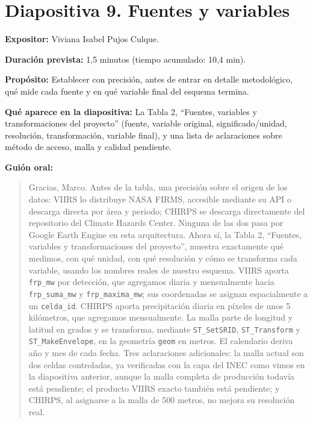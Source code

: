\documentclass[11pt,a4paper]{article}
\newcommand{\campo}[2]{\par\medskip\noindent\textbf{#1:} #2\par}
\newenvironment{guionoral}{%
  \medskip\noindent\textbf{Gui\'on oral:}\par\smallskip
  \begin{quote}\small
}{%
  \end{quote}
}
\begin{document}
\section*{Diapositiva 9. Fuentes y variables}

\campo{Expositor}{Viviana Isabel Pujos Culque.}
\campo{Duraci\'on prevista}{1,5 minutos (tiempo acumulado: 10,4 min).}
\campo{Prop\'osito}{Establecer con precisi\'on, antes de entrar en
detalle metodol\'ogico, qu\'e mide cada fuente y en qu\'e variable
final del esquema termina.}
\campo{Qu\'e aparece en la diapositiva}{La Tabla 2, ``Fuentes,
variables y transformaciones del proyecto'' (fuente, variable
original, significado/unidad, resoluci\'on, transformaci\'on, variable
final), y una lista de aclaraciones sobre m\'etodo de acceso, malla y
calidad pendiente.}

\begin{guionoral}
Gracias, Marco. Antes de la tabla, una precisi\'on sobre el origen de
los datos: VIIRS lo distribuye NASA FIRMS, accesible mediante su API o
descarga directa por \'area y periodo; CHIRPS se descarga directamente
del repositorio del Climate Hazards Center. Ninguna de las dos pasa
por Google Earth Engine en esta arquitectura. Ahora s\'i, la Tabla 2,
``Fuentes, variables y transformaciones del proyecto'', muestra
exactamente qu\'e medimos, con qu\'e unidad, con qu\'e resoluci\'on y
c\'omo se transforma cada variable, usando los nombres reales de
nuestro esquema. VIIRS aporta \texttt{frp\_mw} por detecci\'on, que
agregamos diaria y mensualmente hacia \texttt{frp\_suma\_mw} y
\texttt{frp\_maxima\_mw}; sus coordenadas se asignan espacialmente a un
\texttt{celda\_id}. CHIRPS aporta precipitaci\'on diaria en p\'ixeles de
unos 5 kil\'ometros, que agregamos mensualmente. La malla parte de
longitud y latitud en grados y se transforma, mediante
\texttt{ST\_SetSRID}, \texttt{ST\_Transform} y \texttt{ST\_MakeEnvelope},
en la geometr\'ia \texttt{geom} en metros. El calendario deriva a\~no y
mes de cada fecha. Tres aclaraciones adicionales: la malla actual son
dos celdas controladas, ya verificadas con la capa del INEC como
vimos en la diapositiva anterior, aunque la malla completa de
producci\'on todav\'ia est\'a pendiente; el producto VIIRS exacto
tambi\'en est\'a pendiente; y CHIRPS, al asignarse a la malla de 500
metros, no mejora su resoluci\'on real.
\end{guionoral}
\end{document}
